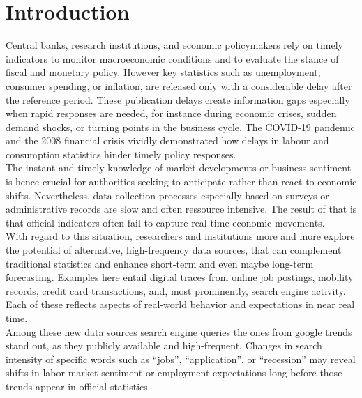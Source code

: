 \documentclass[12pt,a4paper]{article}
\begin{document}
\newpage
\tableofcontents
\newpage
\listoffigures %
\newpage
\listoftables  %
\newpage


\section{Introduction}
Central banks, research institutions, and economic policymakers rely on timely indicators to monitor macroeconomic conditions and to evaluate the stance of fiscal and monetary policy.
However key statistics such as unemployment, consumer spending, or inflation, are released only with a considerable delay after the reference period.
These publication delays create information gaps especially when rapid responses are needed, for instance during economic crises, sudden demand shocks, or turning points in the business cycle.
The COVID-19 pandemic and the 2008 financial crisis vividly demonstrated how delays in labour and consumption statistics hinder timely policy responses.\\
The instant and timely knowledge of market developments or business sentiment is hence crucial for authorities seeking to anticipate rather than react to economic shifts.
Nevertheless, data collection processes especially based on surveys or administrative records are slow and often ressource intensive. The result of that is that official indicators often fail to capture real-time economic movements.
\\
With regard to this situation, researchers and institutions more and more explore the potential of alternative, high-frequency data sources, that can complement traditional statistics and enhance short-term and even maybe long-term forecasting.
Examples here entail digital traces from online job postings, mobility records, credit card transactions, and, most prominently, search engine activity.
Each of these reflects aspects of real-world behavior and expectations in near real time.
\\
Among these new data sources search engine queries the ones from google trends stand out, as they publicly available and high-frequent.
Changes in search intensity of specific words such as “jobs”, “application”, or “recession” may reveal shifts in labor-market sentiment or employment expectations long before those trends appear in official statistics.
\\
\end{document}
